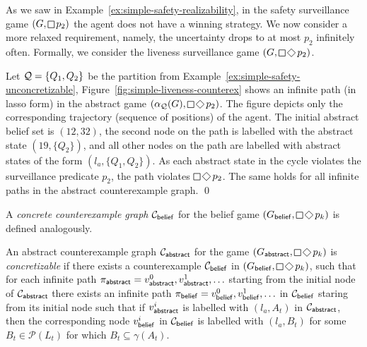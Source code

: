 \begin{example}\label{ex:simple-liveness-counterex}
As we saw in Example~\ref{ex:simple-safety-realizability}, in the safety surveillance game $(G,\LTLglobally p_2)$ the agent does not have a winning strategy. %
We now consider a more relaxed requirement, namely, the uncertainty drops to at most $p_2$ infinitely often. Formally, we consider the liveness surveillance game 
$(G,\LTLglobally \LTLfinally p_2)$.

Let $\mathcal{Q} = \{Q_1,Q_2\}$ be the partition from Example~\ref{ex:simple-safety-unconcretizable},  %
Figure~\ref{fig:simple-liveness-counterex} shows an infinite path (in lasso form) in the abstract game $(\alpha_\part(G),\LTLglobally \LTLfinally p_2)$.  The figure depicts only the corresponding trajectory (sequence of positions) of the agent. The initial abstract belief set is $(12,32)$, the second node on the path is labelled with the abstract state $(19,\{Q_2\})$, and all other nodes on the path are labelled with abstract states of the form $(l_a,\{Q_1,Q_2\})$. As each abstract state in the cycle violates the surveillance predicate $p_2$, the path violates $\LTLglobally \LTLfinally p_2$. The same holds for all infinite paths in the abstract counterexample graph.
\qed
\end{example}

A \emph{concrete counterexample graph} $\mathcal{C}_{\mathsf{belief}}$ for the belief game $(G_\belief,\LTLglobally\LTLfinally p_k)$ is defined analogously. 

An abstract counterexample graph $\mathcal{C}_{\mathsf{abstract}}$ for the game $(G_\abstr,\LTLglobally\LTLfinally p_k)$ is \emph{concretizable} if there exists a counterexample
$\mathcal{C}_{\mathsf{belief}}$ in $(G_\belief,\LTLglobally \LTLfinally p_k)$, such that for each infinite path $\pi_{\mathsf{abstract}} = v_{\mathsf{abstract}}^0,v_{\mathsf{abstract}}^1,\ldots$ starting from the initial node of $\mathcal{C}_{\mathsf{abstract}}$ there exists an infinite path $\pi_{\mathsf{belief}} = v_{\mathsf{belief}}^0,v_{\mathsf{belief}}^1,\ldots$ in $\mathcal{C}_{\mathsf{belief}}$ staring from its initial node such that if $v_{\mathsf{abstract}}^i$ is labelled with $(l_a,A_t)$ in $\mathcal{C}_{\mathsf{abstract}}$, then the corresponding node $v_{\mathsf{belief}}^i$ in $\mathcal{C}_{\mathsf{belief}}$ is labelled with $(l_a,B_t)$ for some $B_t \in \mathcal{P}(L_t)$ for which $B_t \subseteq \gamma(A_t)$.

